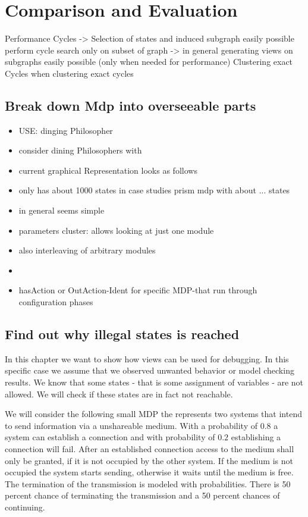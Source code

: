 \documentclass[preview]{standalone}
\begin{document}
\section{Comparison and Evaluation}
Performance Cycles -> Selection of states and induced subgraph easily possible perform cycle search only on subset of graph 
-> in general generating views on subgraphs easily possible (only when needed for performance)
Clustering exact Cycles when clustering exact cycles


\subsection{Break down Mdp into overseeable parts}
\begin{itemize}
	\item USE: dinging Philosopher
	\item consider dining Philosophers with
	\item current graphical Representation looks as follows
	\item only has about 1000 states in case studies prism mdp with about ... states
	\item in general seems simple
	\item parameters cluster: allows looking at just one module
	\item also interleaving of arbitrary modules
	\item
	\item hasAction or OutAction-Ident for specific MDP-that run through configuration phases
	
\end{itemize}

\subsection{Find out why illegal states is reached}
In this chapter we want to show how views can be used for debugging. In this specific case we assume that we observed unwanted behavior or model checking results. We know that some states - that is some assignment of variables - are not allowed. We will check if these states are in fact not reachable.

We will consider the following small MDP the represents two systems that intend to send information via a unshareable medium. With a probability of $0.8$ a system can establish a connection and with probability of $0.2$ establishing a connection will fail. After an established connection access to the medium shall only be granted, if it is not occupied by the other system. If the medium is not occupied the system starts sending, otherwise it waits until the medium is free. The termination of the transmission is modeled with probabilities. There is 50 percent chance of terminating the transmission and a 50 percent chances of continuing.
\end{document}
